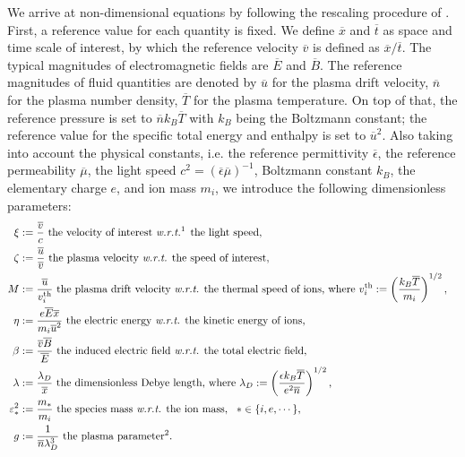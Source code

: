 \documentclass{article}
\begin{document}
We arrive at non-dimensional equations by following the rescaling procedure of
\cite[][Sec.~2.2]{degond_2017}.  First, a reference value for each quantity is
fixed. We define $\overline{x}$ and $\overline{t}$ as space and time scale of
interest, by which the reference velocity $\overline{v}$ is defined as
$\overline{x}/\overline{t}$. The typical magnitudes of electromagnetic fields are
$\overline{E}$ and $\overline{B}$. The reference magnitudes of fluid quantities are
denoted by $\overline{u}$ for the plasma drift velocity, $\overline{n}$ for the plasma number
density, $\overline{T}$ for the plasma temperature. On top of that, the reference pressure is
set to $\overline{n}k_B\overline{T}$ with $k_B$ being the Boltzmann constant; the
reference value for the specific total energy and enthalpy is set to
$\overline{u}^2$. Also taking into account the physical constants, i.e. the reference
permittivity $\overline{\epsilon}$, the reference permeability $\overline{\mu}$, the light
speed $c^2 = (\overline{\epsilon}\overline{\mu})^{-1}$, Boltzmann constant $k_B$, the
elementary charge $e$, and ion mass $m_i$, we introduce the following dimensionless
parameters:
\begin{align*} 
  \xi &:= \frac{\overline{v}}{c} \text{ the velocity of interest \emph{w.r.t.}\footnotemark[1] the light speed}, &\\
  \zeta &:= \frac{\overline{u}}{\overline{v}} \text{ the plasma velocity \emph{w.r.t.} the speed of interest}, &\\
  M &:= \frac{\overline{u}}{v_i^{\text{th}}} \text{ the plasma drift velocity \emph{w.r.t.} the thermal speed of ions, where } v_i^{\text{th}} := \left(\frac{k_B \overline{T}}{m_i}\right)^{1/2}, &\\
  \eta &:= \frac{e\overline{E}\overline{x}}{m_i\overline{u}^2} \text{ the electric energy \emph{w.r.t.} the kinetic energy of ions}, &\\
  \beta &:= \frac{\overline{v}\overline{B}}{\overline{E}} \text{ the induced electric field \emph{w.r.t.} the total electric field}, &\\
  \lambda &:= \frac{\lambda_D}{\overline{x}} \text{ the dimensionless Debye length, where }\lambda_D := \left(\frac{\epsilon k_B\overline{T}}{e^2\overline{n}}\right)^{1/2}, &\\
  \varepsilon_*^2 &:= \frac{m_*}{m_i} \text{ the species mass \emph{w.r.t.} the ion mass},\ \  * \in \{i,e,\cdots\}, &\\
  g &:= \frac{1}{\overline{n}\lambda_D^3} \text{ the plasma parameter\footnotemark[2]}.&
\end{align*}
\end{document}
